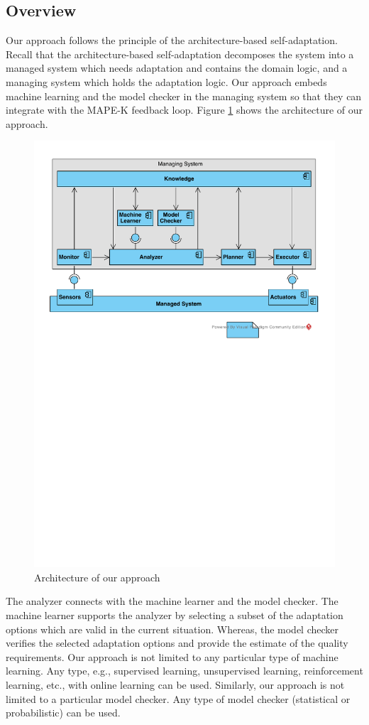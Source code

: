 \documentclass[a4paper,12pt]{article}
\begin{document}
\subsection{Overview}
Our approach follows the principle of the architecture-based self-adaptation. Recall that the architecture-based self-adaptation decomposes the system into a managed system which needs adaptation and contains the domain logic, and a managing system which holds the adaptation logic. Our approach embeds machine learning and the model checker in the managing system so that they can integrate with the MAPE-K feedback loop. Figure \ref{ArchitectureOverview} shows the architecture of our approach.
\begin{figure}[H]
	\centering
	\includegraphics[keepaspectratio, width=\linewidth]{figures/ArchitectureView.pdf}
	\caption{Architecture of our approach}
	\label{ArchitectureOverview}
\end{figure}
The analyzer connects with the machine learner and the model checker. The machine learner supports the analyzer by selecting a subset of the adaptation options which are valid in the current situation. Whereas, the model checker verifies the selected adaptation options and provide the estimate of the quality requirements. Our approach is not limited to any particular type of machine learning. Any type, e.g., supervised learning, unsupervised learning, reinforcement learning, etc., with online learning can be used. Similarly, our approach is not limited to a particular model checker. Any type of model checker (statistical or probabilistic) can be used.
\end{document}
